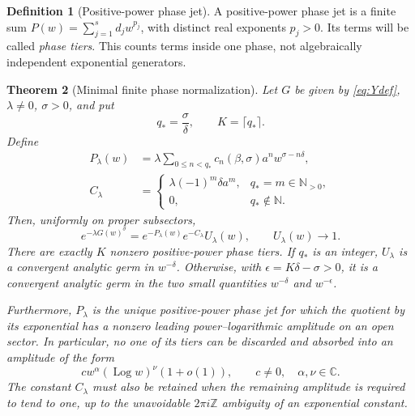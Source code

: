 \documentclass[11pt,a4paper]{article}
\newtheorem{theorem}{Theorem}[section]
\theoremstyle{definition}
\newtheorem{definition}[theorem]{Definition}
\theoremstyle{remark}
\newcommand{\C}{\mathbb C}
\newcommand{\N}{\mathbb N}
\newcommand{\Log}{\operatorname{Log}}
\numberwithin{equation}{section}
\begin{document}
\begin{definition}[Positive-power phase jet]
A positive-power phase jet is a finite sum $P(w)=\sum_{j=1}^s d_jw^{p_j}$, with distinct real exponents $p_j>0$. Its terms will be called \emph{phase tiers}. This counts terms inside one phase, not algebraically independent exponential generators.
\end{definition}

\begin{theorem}[Minimal finite phase normalization]\label{thm:finitejet}
Let $G$ be given by \eqref{eq:Ydef}, $\lambda\ne0$, $\sigma>0$, and put
\[
 q_*=\frac{\sigma}{\delta},\qquad K=\lceil q_*\rceil.
\]
Define
\begin{align}
 P_\lambda(w)&=\lambda\sum_{0\le n<q_*}
 c_n(\beta,\sigma)a^n w^{\sigma-n\delta},\label{eq:Pphase}\\
 C_\lambda&=
 \begin{cases}
 \lambda(-1)^m\delta a^m,&q_*=m\in\N_{>0},\\
 0,&q_*\notin\N.
 \end{cases}\label{eq:Cphase}
\end{align}
Then, uniformly on proper subsectors,
\begin{equation}\label{eq:phasefactorization}
 e^{-\lambda G(w)^\sigma}
 =e^{-P_\lambda(w)}e^{-C_\lambda}U_\lambda(w),
 \qquad U_\lambda(w)\longrightarrow1.
\end{equation}
There are exactly $K$ nonzero positive-power phase tiers. If $q_*$ is an integer, $U_\lambda$ is a convergent analytic germ in $w^{-\delta}$. Otherwise, with
$\epsilon=K\delta-\sigma>0$, it is a convergent analytic germ in the two small quantities $w^{-\delta}$ and $w^{-\epsilon}$.

Furthermore, $P_\lambda$ is the unique positive-power phase jet for which the quotient by its exponential has a nonzero leading power--logarithmic amplitude on an open sector. In particular, no one of its tiers can be discarded and absorbed into an amplitude of the form
\begin{equation}\label{eq:plamplitude}
 c w^\alpha(\Log w)^\nu(1+o(1)),\qquad c\ne0,\quad \alpha,\nu\in\C.
\end{equation}
The constant $C_\lambda$ must also be retained when the remaining amplitude is required to tend to one, up to the unavoidable $2\pi i\mathbb Z$ ambiguity of an exponential constant.
\end{theorem}
\end{document}
